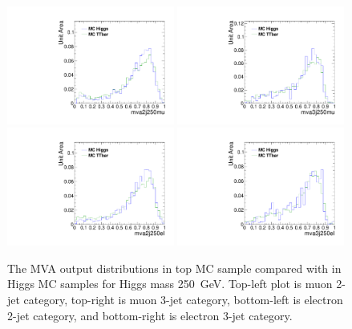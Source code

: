\begin{figure}[!t]
  \centering
  \includegraphics[width=0.49\textwidth]{figs/cl-mva2j250mu-mvaTopvsHiggs.pdf}
  \includegraphics[width=0.49\textwidth]{figs/cl-mva3j250mu-mvaTopvsHiggs.pdf}
  \includegraphics[width=0.49\textwidth]{figs/cl-mva2j250el-mvaTopvsHiggs.pdf}
  \includegraphics[width=0.49\textwidth]{figs/cl-mva3j250el-mvaTopvsHiggs.pdf}
  \caption{\label{fig:mva:sigvsttbar-mva2j250}The MVA output
    distributions in top MC sample compared with in Higgs MC
    samples for Higgs mass 250~GeV. Top-left plot is muon 2-jet category,
    top-right is muon 3-jet category, bottom-left is electron 2-jet
    category, and bottom-right is electron 3-jet category. }
\end{figure}

